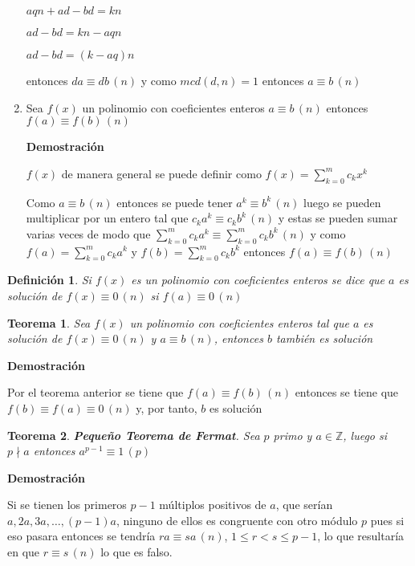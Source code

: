 \documentclass[a4paper,12pt]{report}
\newtheorem*{teo}{Teorema}
\newtheorem*{dfn}{Definición}
\begin{document}
\begin{enumerate}
 $aqn+ad-bd=kn$
 
 $ad-bd=kn-aqn$
 
 $ad-bd=(k-aq)n$
 
 entonces $da\equiv db \, (n)$ y como $mcd(d,n)=1$ entonces $a\equiv b\, (n)$
 
 \item Sea $f(x)$ un polinomio con coeficientes enteros $a \equiv b \, (n)$ entonces 
 $f(a) \equiv f(b) \, (n)$
 
  \textbf{Demostración}
  
  $f(x)$ de manera general se puede definir como $f(x)=\sum^{m}_{k=0}c_kx^k$
  
  Como $a \equiv b \, (n)$ entonces se puede tener $a^k \equiv b^k \, (n)$ luego se pueden multiplicar por un entero tal que $c_ka^k \equiv c_kb^k \, (n)$ y estas se pueden sumar varias veces de modo que $\sum^{m}_{k=0}c_ka^k \equiv \sum^{m}_{k=0}c_kb^k \, (n)$ y como $f(a)=\sum^{m}_{k=0}c_ka^k$ y $f(b)=\sum^{m}_{k=0}c_kb^k$ entonces $f(a)\equiv f(b) \, (n)$
  
  
\end{enumerate}

\begin{dfn}
 Si $f(x)$ es un polinomio con coeficientes enteros se dice que $a$ es solución de $f(x)\equiv 0 \, (n)$ si $f(a)\equiv 0 \, (n)$
\end{dfn}


\begin{teo}
 Sea $f(x)$ un polinomio con coeficientes enteros tal que $a$ es solución de  $f(x)\equiv 0 \, (n)$  y $a \equiv b \, (n)$, entonces $b$ también es solución
\end{teo}

\textbf{Demostración}

Por el teorema anterior se tiene que $f(a)\equiv f(b) \, (n)$ entonces se tiene que $f(b)\equiv f(a) \equiv 0\, (n)$ y, por tanto, $b$ es solución




\begin{teo}
 \textbf{Pequeño Teorema de Fermat}. Sea $p$ primo y $a\in\mathbb{Z}$, luego si $p\nmid a$ entonces $a^{p-1} \equiv 1 \, (p)$
\end{teo}

\textbf{Demostración}

Si se tienen los primeros $p-1$ múltiplos positivos de $a$, que serían $a,2a,3a,\dots,(p-1)a$, ninguno de ellos es congruente con otro módulo $p$ pues si eso pasara entonces se tendría $ra\equiv sa \, (n)$, $1\leq r < s \leq p-1$, lo que resultaría en que $r\equiv s \, (n)$ lo que es falso.
\end{document}
